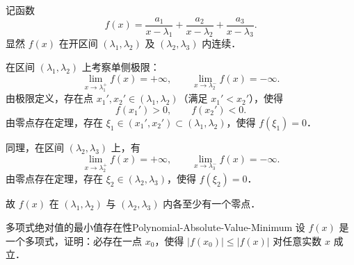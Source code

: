 \begin{myproof}
    记函数
    \begin{equation}
        f(x) = \frac{a_1}{x-\lambda_1} + \frac{a_2}{x-\lambda_2} + \frac{a_3}{x-\lambda_3}.
    \end{equation}
    显然 $f(x)$ 在开区间 $(\lambda_1, \lambda_2)$ 及 $(\lambda_2, \lambda_3)$ 内连续．

    在区间 $(\lambda_1, \lambda_2)$ 上考察单侧极限：
    \begin{equation}
        \lim_{x\to \lambda_1^+} f(x) = +\infty, \qquad \lim_{x\to \lambda_2^-} f(x) = -\infty.
    \end{equation}
    由极限定义，存在点 $x_1', x_2' \in (\lambda_1, \lambda_2)$（满足 $x_1' < x_2'$），使得
    \begin{equation}
        f(x_1') > 0, \qquad f(x_2') < 0.
    \end{equation}
    由零点存在定理，存在 $\xi_1 \in (x_1', x_2') \subset (\lambda_1, \lambda_2)$，使得 $f(\xi_1) = 0$．

    同理，在区间 $(\lambda_2, \lambda_3)$ 上，有
    \begin{equation}
        \lim_{x\to \lambda_2^+} f(x) = +\infty, \qquad \lim_{x\to \lambda_3^-} f(x) = -\infty.
    \end{equation}
    由零点存在定理，存在 $\xi_2 \in (\lambda_2, \lambda_3)$，使得 $f(\xi_2) = 0$．

    故 $f(x)$ 在 $(\lambda_1, \lambda_2)$ 与 $(\lambda_2, \lambda_3)$ 内各至少有一个零点．
\end{myproof}

\begin{problem}{多项式绝对值的最小值存在性}{Polynomial-Absolute-Value-Minimum}
    设 $f(x)$ 是一个多项式，证明：必存在一点 $x_0$，使得 $|f(x_0)| \leqslant |f(x)|$ 对任意实数 $x$ 成立．
\end{problem}

